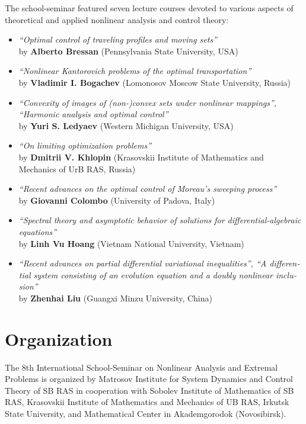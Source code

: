 \documentclass[12pt,final]{llncs}
\begin{document}
\begin{english}
\begin{itemize}
\end{itemize}
The school-seminar featured seven lecture courses devoted to various aspects of theoretical and applied nonlinear analysis and control theory:
\begin{itemize}
\item \emph{``Optimal control of traveling profiles and moving sets''}\\ by  \textbf{Alberto Bressan} (Pennsylvania State University, USA)\smallskip
\item \emph{``Nonlinear Kantorovich problems of the optimal transportation''}\\ by  \textbf{Vladimir I. Bogachev} (Lomonosov Moscow State University, Russia)\smallskip
\item \emph{``Convexity of images of (non-)convex sets under nonlinear mappings'', ``Harmonic analysis and optimal control''}\\ by \textbf{Yuri S. Ledyaev} (Western Michigan University, USA)\smallskip
\item \emph{``On limiting optimization problems''}\\ by  \textbf{Dmitrii V. Khlopin } (Krasovskii Institute of Mathematics and Mechanics of UrB RAS, Russia)\smallskip
\item \emph{``Recent advances on the optimal control of Moreau's sweeping process''}\\ by \textbf{Giovanni Colombo} (University of Padova, Italy)\smallskip
\item \emph{``Spectral theory and asymptotic behavior of solutions for differential-algebraic equations''}\\ by \textbf{Linh Vu Hoang} (Vietnam National University, Vietnam)\smallskip
\item \emph{``Recent advances on partial differential variational inequalities'', ``A differential system consisting of an evolution equation and a doubly nonlinear inclusion''}\\ by \textbf{Zhenhai Liu} (Guangxi Minzu University, China)\smallskip
\end{itemize}

\end{english}

%
\chapter*{Organization}
\vspace{-2em}
 \begin{englisharticle}
The 8th International School-Seminar on Nonlinear Analysis and Extremal Problems is organized by Matrosov
Institute for System Dynamics and Control Theory of SB RAS in cooperation with
Sobolev Institute of Mathematics  of SB RAS,
  Krasovskii Institute of Mathematics and Mechanics of UB RAS,
 	Irkutsk State University, and Mathematical Center in Akademgorodok (Novosibirsk).
 \end{englisharticle}
\end{document}
